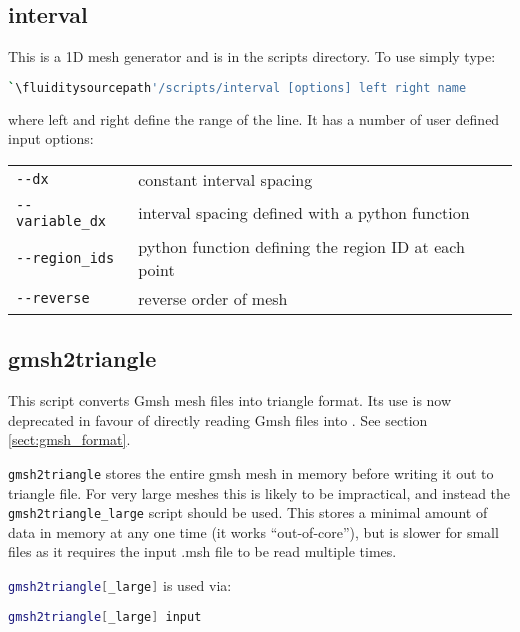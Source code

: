 \subsection{interval}
This is a 1D mesh generator and is in the scripts directory. To use simply type:


\begin{lstlisting}[language = Bash]
`\fluiditysourcepath'/scripts/interval [options] left right name 
\end{lstlisting}

where left and right define the range of the line. It has a number of user defined input options:


\begin{center}
  \begin{tabular}{lp{}}
    \hline
    \lstinline+--dx+ & constant interval spacing\\
    \lstinline+--variable_dx+ & interval spacing defined with a python function\\
    \lstinline+--region_ids+ & python function defining the region ID at each point\\
    \lstinline+--reverse+ & reverse order of mesh\\
    \hline
  \end{tabular}
\end{center}



\subsection{gmsh2triangle}

This script converts Gmsh mesh files into triangle format. Its use is now
deprecated in favour of directly reading Gmsh files into \fluidity. See
section \ref{sect:gmsh_format}.

\lstinline[language=Bash]{gmsh2triangle} stores the entire gmsh mesh in memory before writing it out to
triangle file. For very large meshes this is likely to be impractical,
and instead the \lstinline[language=Bash]{gmsh2triangle_large} script
should be used. This stores a minimal
amount of data in memory at any one time (it works ``out-of-core''), but
is slower for small files as it requires the input .msh file to be read multiple
times.

\lstinline[language=Bash]{gmsh2triangle[_large]} is used via:

\begin{lstlisting}[language = Bash]
gmsh2triangle[_large] input
\end{lstlisting}

